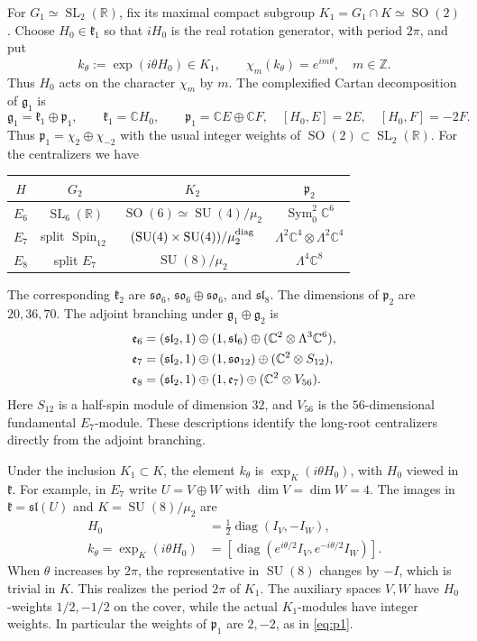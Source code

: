 \documentclass[11pt]{article}
\newcommand{\C}{\mathbb C}
\newcommand{\R}{\mathbb R}
\newcommand{\Z}{\mathbb Z}
\newcommand{\Sym}{\operatorname{Sym}}
\newcommand{\SL}{\operatorname{SL}}
\newcommand{\SO}{\operatorname{SO}}
\newcommand{\SU}{\operatorname{SU}}
\newcommand{\Spin}{\operatorname{Spin}}
\newcommand{\fg}{\mathfrak g}
\newcommand{\fk}{\mathfrak k}
\newcommand{\fp}{\mathfrak p}
\theoremstyle{definition}
\numberwithin{equation}{section}
\begin{document}
For $G_1\simeq\SL_2(\R)$, fix its maximal compact subgroup
$K_1=G_1\cap K\simeq\SO(2)$. Choose $H_0\in\fk_1$ so that
$iH_0$ is the real rotation generator, with period $2\pi$, and put
\[
 k_\theta:=\exp(i\theta H_0)\in K_1,\qquad
 \chi_m(k_\theta)=e^{im\theta},\quad m\in\Z.
\]
Thus $H_0$ acts on the character $\chi_m$ by $m$.
The complexified Cartan decomposition of $\fg_1$ is
\begin{equation}\label{eq:p1}
 \fg_1=\fk_1\oplus\fp_1,\qquad
 \fk_1=\C H_0,\qquad \fp_1=\C E\oplus\C F,
 \quad [H_0,E]=2E,\quad[H_0,F]=-2F.
\end{equation}
Thus $\fp_1=\chi_2\oplus\chi_{-2}$ with the usual integer weights of
$\SO(2)\subset\SL_2(\R)$. For the centralizers we have
\begin{center}
\begin{tabular}{c c c c}
\toprule
$H$ & $G_2$ & $K_2$ & $\fp_2$ \\
\midrule
$E_6$ & $\SL_6(\R)$ & $\SO(6)\simeq\SU(4)/\mu_2$
 & $\Sym^2_0\C^6$ \\
$E_7$ & split $\Spin_{12}$ & $(\SU(4)\times\SU(4))/\mu_2^{\rm diag}$
 & $\Lambda^2\C^4\otimes\Lambda^2\C^4$ \\
$E_8$ & split $E_7$ & $\SU(8)/\mu_2$ & $\Lambda^4\C^8$ \\
\bottomrule
\end{tabular}
\end{center}
The corresponding $\fk_2$ are $\mathfrak{so}_6$,
$\mathfrak{so}_6\oplus\mathfrak{so}_6$, and $\mathfrak{sl}_8$.
The dimensions of $\fp_2$ are $20,36,70$.
The adjoint branching under $\fg_1\oplus\fg_2$ is
\begin{align}
 \mathfrak e_6&=(\mathfrak{sl}_2,1)\oplus(1,\mathfrak{sl}_6)
                  \oplus(\C^2\otimes\Lambda^3\C^6),\notag\\
 \mathfrak e_7&=(\mathfrak{sl}_2,1)\oplus(1,\mathfrak{so}_{12})
                  \oplus(\C^2\otimes S_{12}),\label{eq:adjoint}\\
 \mathfrak e_8&=(\mathfrak{sl}_2,1)\oplus(1,\mathfrak e_7)
                  \oplus(\C^2\otimes V_{56}).\notag
\end{align}
Here $S_{12}$ is a half-spin module of dimension $32$, and $V_{56}$ is
the $56$-dimensional fundamental $E_7$-module. These descriptions identify
the long-root centralizers directly from the adjoint branching.

Under the inclusion $K_1\subset K$, the element $k_\theta$ is
$\exp_K(i\theta H_0)$, with $H_0$ viewed in $\fk$.
For example, in $E_7$ write $U=V\oplus W$ with
$\dim V=\dim W=4$. The images in $\fk=\mathfrak{sl}(U)$ and
$K=\SU(8)/\mu_2$ are
\begin{align*}
 H_0&=\tfrac12\operatorname{diag}(I_V,-I_W),\\
 k_\theta=\exp_K(i\theta H_0)
   &=[\operatorname{diag}(e^{i\theta/2}I_V,e^{-i\theta/2}I_W)].
\end{align*}
When $\theta$ increases by $2\pi$, the representative in $\SU(8)$
changes by $-I$, which is trivial in $K$. This realizes the period
$2\pi$ of $K_1$. The auxiliary spaces $V,W$ have $H_0$-weights
$1/2,-1/2$ on the cover, while the actual $K_1$-modules have integer
weights. In particular the weights of $\fp_1$ are $2,-2$, as in
\eqref{eq:p1}.
\end{document}
